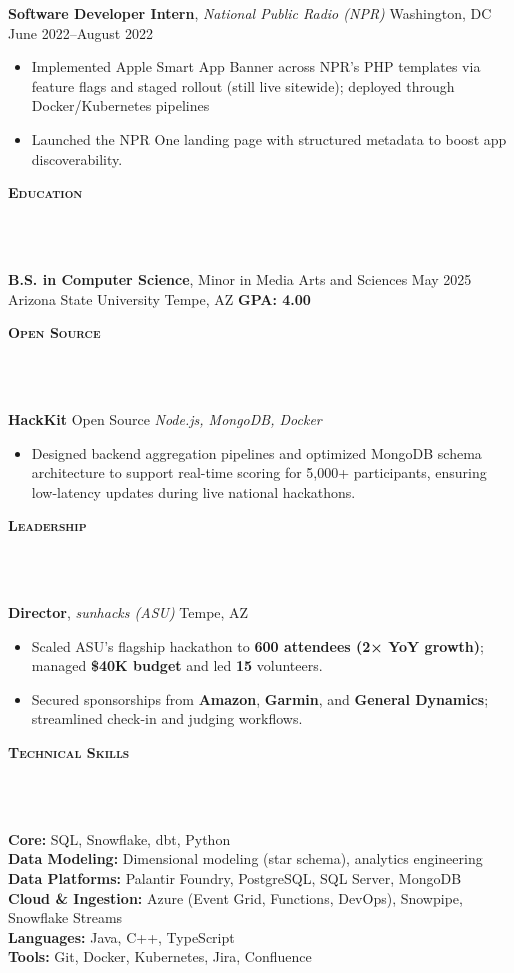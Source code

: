 \documentclass[10pt]{article}
\newcommand{\lineunder} {
    \vspace*{-10pt} \\
    \hspace*{-18pt} \hrulefill \\
    \vspace*{2pt}
}
\newcommand{\header} [1] {
  \vspace*{2pt}
    {\hspace*{-15pt}\textsc{#1}}
    \lineunder
}
\begin{document}
\textbf{Software Developer Intern}, \textit{National Public Radio (NPR)} \hfill Washington, DC \textbar{} June 2022--August 2022\\
\begin{itemize}[leftmargin=5mm, itemsep=0mm]
  \item Implemented Apple Smart App Banner across NPR's PHP templates via feature flags and staged rollout (still live sitewide); deployed through Docker/Kubernetes pipelines 
  \item Launched the NPR One landing page with structured metadata to boost app discoverability.
\end{itemize}

\header{\textbf{Education}}
\textbf{B.S. in Computer Science}, Minor in Media Arts and Sciences \hfill May 2025\\
Arizona State University \hfill Tempe, AZ \textbar{} \textbf{GPA: 4.00}

\header{\textbf{Open Source}}

\textbf{HackKit} \hfill Open Source \textbar{} \textit{Node.js, MongoDB, Docker}\\
\begin{itemize}[leftmargin=5mm, itemsep=0mm]
  \item Designed backend aggregation pipelines and optimized MongoDB schema architecture to support real-time scoring for 5,000+ participants, ensuring low-latency updates during live national hackathons.
\end{itemize}

\header{\textbf{Leadership}}

\textbf{Director}, \textit{sunhacks (ASU)} \hfill Tempe, AZ\\
\begin{itemize}[leftmargin=5mm, itemsep=0mm]
  \item Scaled ASU’s flagship hackathon to \textbf{600 attendees (2× YoY growth)}; managed \textbf{\$40K budget} and led \textbf{15} volunteers.
  \item Secured sponsorships from \textbf{Amazon}, \textbf{Garmin}, and \textbf{General Dynamics}; streamlined check-in and judging workflows.
\end{itemize}

\header{\textbf{Technical Skills}}
\textbf{Core:} SQL, Snowflake, dbt, Python\\
\textbf{Data Modeling:} Dimensional modeling (star schema), analytics engineering\\
\textbf{Data Platforms:} Palantir Foundry, PostgreSQL, SQL Server, MongoDB\\
\textbf{Cloud \& Ingestion:} Azure (Event Grid, Functions, DevOps), Snowpipe, Snowflake Streams\\
\textbf{Languages:} Java, C++, TypeScript\\
\textbf{Tools:} Git, Docker, Kubernetes, Jira, Confluence
\end{document}
